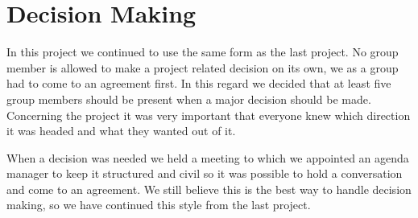 \section{Decision Making}
In this project we continued to use the same form as the last project. No group member is allowed to make a project related decision on its own, we as a group had to come to an agreement first. In this regard we decided that at least five group members should be present when a major decision should be made. Concerning the project it was very important that everyone knew which direction it was headed and what they wanted out of it.

When a decision was needed we held a meeting to which we appointed an agenda manager to keep it structured and civil so it was possible to hold a conversation and come to an agreement.
We still believe this is the best way to handle decision making, so we have continued this style from the last project.